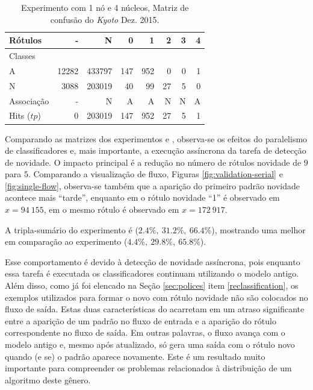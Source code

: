 \begin{table}[hbt]
  \centering
  \caption{Experimento \mfog \single com 1 nó e 4 núcleos, Matriz de confusão do \dataset \emph{Kyoto} Dez. 2015.}
  \label{tab:single-matrix}
  \begin{tabular}{l|r|r|r|r|r|r|r}
    Rótulos &      - &       N &    0 &    1 &   2 &  3 &  4 \\\hline
    Classes  &        &         &      &      &     &    &    \\\hline
    \hline
    A        &  12282 &  433797 &  147 &  952 &   0 &  0 &  1 \\\hline
    N        &   3088 &  203019 &   40 &   99 &  27 &  5 &  0 \\\hline
    \hline
    Associação &      - &       N &    A &    A &   N &  N &  A \\\hline
    Hits ($tp$)     &      0 &  203019 &  147 &  952 &  27 &  5 &  1 
  \end{tabular}
\end{table}

Comparando as matrizes dos experimentos \serial e \single, observa-se os
efeitos do paralelismo de classificadores e, mais importante, a execução
assíncrona da tarefa de detecção de novidade.
O impacto principal é a redução no número de rótulos novidade de $9$ para $5$.
Comparando a visualização de fluxo, Figuras \ref{fig:validation-serial} e
\ref{fig:single-flow}, observa-se também que a aparição do primeiro padrão
novidade acontece mais ``tarde'', enquanto em \serial o rótulo novidade ``1'' é
observado em $x = 94\:155$, em \single o mesmo rótulo é observado em $x =
172\:917$.

A tripla-sumário do experimento \single é ($2.4\%,\: 31.2\%,\: 66.4\%$),
mostrando uma melhor em comparação ao experimento \serial ($4.4\%,\: 29.8\%,\: 65.8\%$).

Esse comportamento é devido à detecção de novidade assíncrona, pois enquanto
essa tarefa é executada os classificadores continuam utilizando o modelo antigo.
Além disso, como já foi elencado na Seção \ref{sec:polices} item
\ref{reclassification}, os exemplos utilizados para formar o novo \mcluster
com rótulo novidade não são colocados no fluxo de saída.
Estas duas características do \mfog acarretam em um atraso significante entre a
aparição de um padrão no fluxo de entrada e a aparição do rótulo correspondente
no fluxo de saída.
Em outras palavras, o fluxo avança com o modelo antigo e, mesmo após atualizado,
só gera uma saída com o rótulo novo quando (e se) o padrão aparece novamente.
Este é um resultado muito importante para compreender os problemas relacionados
à distribuição de um algoritmo deste gênero.


